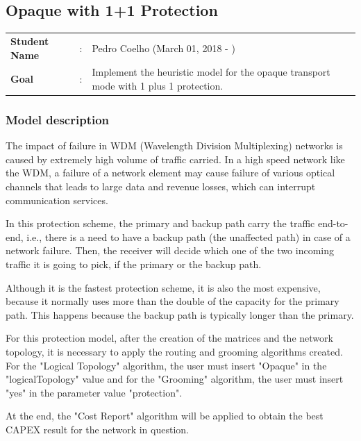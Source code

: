\clearpage

\subsection{Opaque with 1+1 Protection}\label{heuristic_Opaque_Protection}
\begin{tcolorbox}	
\begin{tabular}{p{2.75cm} p{0.2cm} p{10.5cm}} 	
\textbf{Student Name}  &:& Pedro Coelho    (March 01, 2018 - )\\
\textbf{Goal}          &:& Implement the heuristic model for the opaque transport mode with 1 plus 1 protection.
\end{tabular}
\end{tcolorbox}

\subsubsection{Model description}

\vspace{11pt}
The impact of failure in WDM (Wavelength Division Multiplexing) networks is caused by extremely high volume of traffic carried. In a high speed network like the WDM, a failure of a network element may cause failure of various optical channels that leads to large data and revenue losses, which can interrupt communication services.

In this protection scheme, the primary and backup path carry the traffic end-to-end, i.e., there is a need to have a backup path (the unaffected path) in case of a network failure. Then, the receiver will decide which one of the two incoming traffic it is going to pick, if the primary or the backup path.

Although it is the fastest protection scheme, it is also the most expensive, because it normally uses more than the double of the capacity for the primary path. This happens because the backup path is typically longer than the primary.

For this protection model, after the creation of the matrices and the network topology, it is necessary to apply the routing and grooming algorithms created. For the "Logical Topology" algorithm, the user must insert "Opaque" in the "logicalTopology" value and for the "Grooming" algorithm, the user must insert "yes" in the parameter value "protection".

At the end, the "Cost Report" algorithm will be applied to obtain the best CAPEX result for the network in question.

